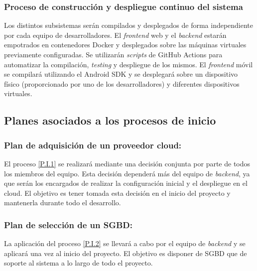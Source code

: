 \documentclass{article}
\begin{document}
\subsubsection{Proceso de construcción y despliegue continuo del sistema} \label{P.T.6}
Los distintos subsistemas serán compilados y desplegados de forma independiente por cada equipo de desarrolladores.
El \textit{frontend} web y el \textit{backend} estarán empotrados en contenedores Docker y desplegados sobre las máquinas virtuales previamente configuradas. Se utilizarán \textit{scripts} de GitHub Actions para automatizar la compilación, \textit{testing} y despliegue de los mismos. El \textit{frontend} móvil se compilará utilizando el Android SDK y se desplegará sobre un dispositivo físico (proporcionado por uno de los desarrolladores) y diferentes dispositivos virtuales.

\pagebreak


\subsection{Planes asociados a los procesos de inicio}

\subsubsection{Plan de adquisición de un proveedor cloud:} \label{PL.I.1}

El proceso \ref{P.I.1} se realizará mediante una decisión conjunta por parte de todos los miembros del equipo. Esta decisión dependerá más del equipo de \textit{backend}, ya que serán los encargados de realizar la configuración inicial y el despliegue en el cloud. El objetivo es tener tomada esta decisión en el inicio del proyecto y mantenerla durante todo el desarrollo.
 
\subsubsection{Plan de selección de un SGBD:}  \label{PL.I.2}

La aplicación del proceso \ref{P.I.2} se llevará a cabo por el equipo de \textit{backend} y se aplicará una vez al inicio del proyecto. El objetivo es disponer de SGBD que de soporte al sistema a lo largo de todo el proyecto.
\end{document}
